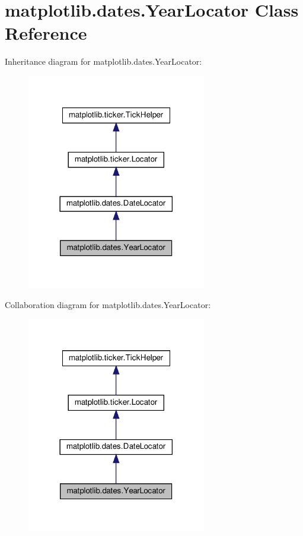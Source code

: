 \hypertarget{classmatplotlib_1_1dates_1_1YearLocator}{}\section{matplotlib.\+dates.\+Year\+Locator Class Reference}
\label{classmatplotlib_1_1dates_1_1YearLocator}


Inheritance diagram for matplotlib.\+dates.\+Year\+Locator\+:
\nopagebreak
\begin{figure}[H]
\begin{center}
\leavevmode
\includegraphics[width=222pt]{classmatplotlib_1_1dates_1_1YearLocator__inherit__graph}
\end{center}
\end{figure}


Collaboration diagram for matplotlib.\+dates.\+Year\+Locator\+:
\nopagebreak
\begin{figure}[H]
\begin{center}
\leavevmode
\includegraphics[width=222pt]{classmatplotlib_1_1dates_1_1YearLocator__coll__graph}
\end{center}
\end{figure}
